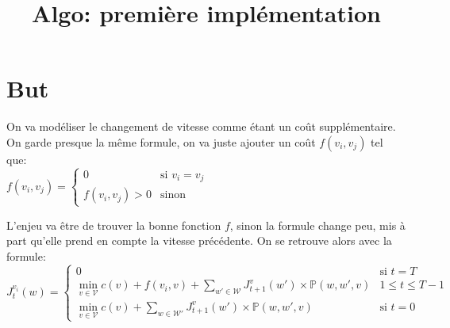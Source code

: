 \documentclass[10pt,a4paper]{article}
\title{Algo: première implémentation}
\newcommand{\W}{\mathcal{W}}
\newcommand{\V}{\mathcal{V}}
\begin{document}
\maketitle

\section{But}
On va modéliser le changement de vitesse comme étant un coût
supplémentaire. On garde presque la même formule, on va juste ajouter
un coût $f(v_i,v_j)$ tel que:\\
$f(v_i,v_j)=
\begin{cases}
  0 & \text{si } v_i=v_j \\
  f(v_i,v_j)>0 & \text{sinon}
\end{cases}
$

L'enjeu va être de trouver la bonne fonction $f$, sinon la formule
change peu, mis à part qu'elle prend en compte la vitesse
précédente. On se retrouve alors avec la formule:
\begin{equation}
  J_t^{v_i}(w) =
  \begin{cases}
    0 & \text{si } t=T\\
    \min_{v\in\V}
    c(v)+f(v_i,v)+\sum_{w'\in\W}J_{t+1}^v(w')\times\mathbb{P}(w,w',v) & 1\leq
    t\leq T-1\\
        \min_{v\in\V}
    c(v)+\sum_{w\in\W'}J_{t+1}^v(w')\times\mathbb{P}(w,w',v) & \text{si }t=0

  \end{cases}
\end{equation}
\end{document}
